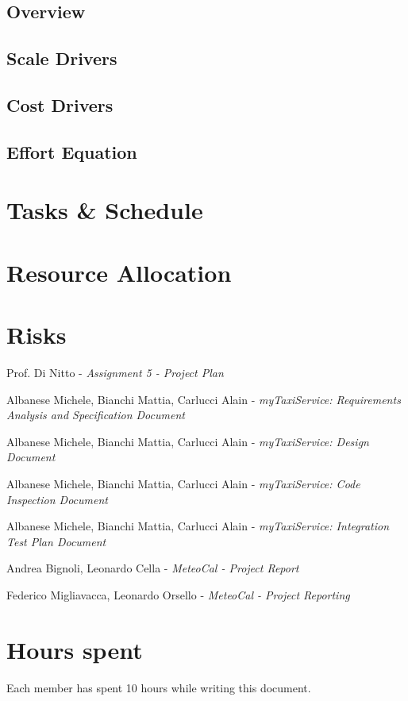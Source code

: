 \documentclass[a4paper, 12pt]{article}
\begin{document}
\subsection{Overview} %
\label{sub:cocomo_overview}

\subsection{Scale Drivers} %
\label{sub:scale_drivers}

\subsection{Cost Drivers} %
\label{sub:cost_drivers}

\subsection{Effort Equation} %
\label{sub:effort_equation}

\newpage
\section{Tasks \& Schedule}

\newpage
\section{Resource Allocation}

\newpage
\section{Risks}

\appendix

\clearpage
{}

\begin{thebibliography}{9}
    Prof. Di Nitto - \emph{Assignment 5 - Project Plan}

        Albanese Michele, Bianchi Mattia, Carlucci Alain - \emph{myTaxiService: Requirements Analysis and Specification Document}

        Albanese Michele, Bianchi Mattia, Carlucci Alain - \emph{myTaxiService: Design Document}

        Albanese Michele, Bianchi Mattia, Carlucci Alain - \emph{myTaxiService: Code Inspection Document}

        Albanese Michele, Bianchi Mattia, Carlucci Alain - \emph{myTaxiService: Integration Test Plan Document}

        Andrea Bignoli, Leonardo Cella - \emph{MeteoCal - Project Report}

Federico Migliavacca, Leonardo Orsello - \emph{MeteoCal - Project Reporting}

\end{thebibliography}

\vfill

\section*{Hours spent}
Each member has spent 10 hours while writing this document.
\end{document}
